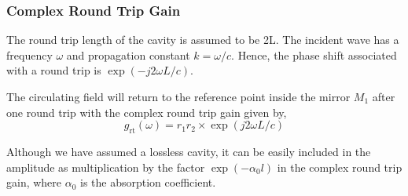 \documentclass{Resources/cquicc}
\begin{document}
\subsubsection{Complex Round Trip Gain} The round trip length of the cavity is assumed to be 2L. The incident wave has a frequency $\omega$ and propagation constant $k = \omega/c$. Hence, the phase shift associated with a round trip is $\exp(-j2\omega L/c)$. \par 
The circulating field will return to the reference point inside the mirror $M_1$ after one round trip with the complex round trip gain given by, 
\begin{equation}
    g_{\text{rt}}(\omega) = r_1r_2\times \exp(j2\omega L/c)
\end{equation}
\par
Although we have assumed a lossless cavity, it can be easily included in the amplitude as multiplication by the factor $\exp (-\alpha_0 l) $ in the complex round trip gain, where $\alpha_0$ is the absorption coefficient.  \par
\end{document}
